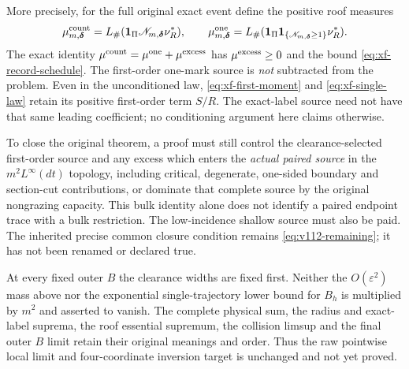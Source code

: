 More precisely, for the full original exact event define the positive
roof measures
\[
 \mu^{\rm count}_{m,\boldsymbol\delta}
   =L_\#(\mathbf1_\Pi\mathscr N_{m,\boldsymbol\delta}\nu_R^*),\qquad
 \mu^{\rm one}_{m,\boldsymbol\delta}
   =L_\#(\mathbf1_\Pi\mathbf1_{\{\mathscr N_{m,\boldsymbol\delta}\ge1\}}
                                                    \nu_R^*).
\]
The exact identity
$\mu^{\rm count}=\mu^{\rm one}+\mu^{\rm excess}$ has
$\mu^{\rm excess}\ge0$ and the bound
\eqref{eq:xf-record-schedule}. The first-order one-mark source is
\emph{not} subtracted from the problem. Even in the unconditioned
law, \eqref{eq:xf-first-moment} and \eqref{eq:xf-single-law} retain
its positive first-order term $S/R$. The exact-label source need not
have that same leading coefficient; no conditioning argument here
claims otherwise.

To close the original theorem, a proof must still control the
clearance-selected first-order source and any excess which enters
the \emph{actual paired source} in the $m^2L^\infty(dt)$ topology,
including critical, degenerate, one-sided boundary and section-cut
contributions, or dominate that complete source by the original
nongrazing capacity. This bulk identity alone does not identify a
paired endpoint trace with a bulk restriction. The low-incidence
shallow source must also be paid. The inherited precise common
closure condition remains \eqref{eq:v112-remaining}; it has not
been renamed or declared true.

At every fixed outer $B$ the clearance widths are fixed first.
Neither the $O(\varepsilon^2)$ mass above nor the exponential
single-trajectory lower bound for $B_h$ is multiplied by $m^2$
and asserted to vanish. The complete physical sum, the radius and
exact-label suprema, the roof essential supremum, the collision
limsup and the final outer $B$ limit retain their original meanings
and order. Thus the raw pointwise local limit and four-coordinate
inversion target is unchanged and not yet proved.
